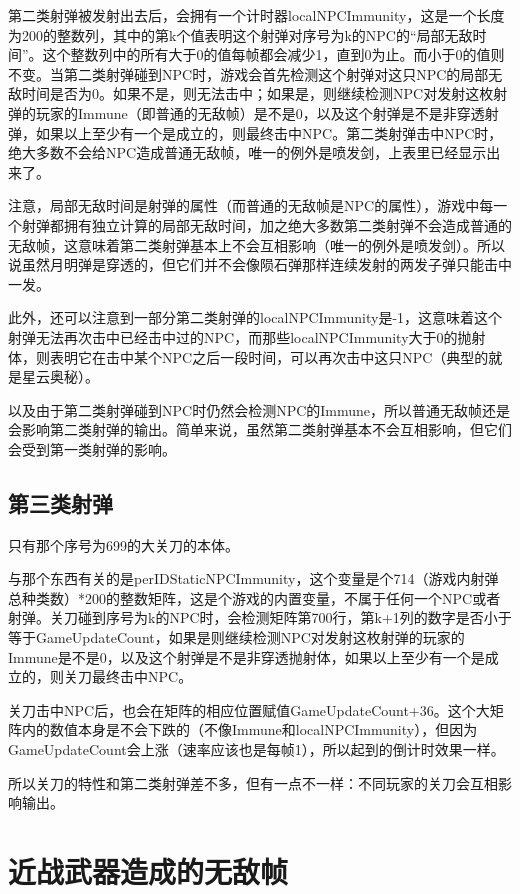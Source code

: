 第二类射弹被发射出去后，会拥有一个计时器localNPCImmunity，这是一个长度为200的整数列，其中的第k个值表明这个射弹对序号为k的NPC的“局部无敌时间”。这个整数列中的所有大于0的值每帧都会减少1，直到0为止。而小于0的值则不变。当第二类射弹碰到NPC时，游戏会首先检测这个射弹对这只NPC的局部无敌时间是否为0。如果不是，则无法击中；如果是，则继续检测NPC对发射这枚射弹的玩家的Immune（即普通的无敌帧）是不是0，以及这个射弹是不是非穿透射弹，如果以上至少有一个是成立的，则最终击中NPC。第二类射弹击中NPC时，绝大多数不会给NPC造成普通无敌帧，唯一的例外是喷发剑，上表里已经显示出来了。

注意，局部无敌时间是射弹的属性（而普通的无敌帧是NPC的属性），游戏中每一个射弹都拥有独立计算的局部无敌时间，加之绝大多数第二类射弹不会造成普通的无敌帧，这意味着第二类射弹基本上不会互相影响（唯一的例外是喷发剑）。所以说虽然月明弹是穿透的，但它们并不会像陨石弹那样连续发射的两发子弹只能击中一发。

此外，还可以注意到一部分第二类射弹的localNPCImmunity是-1，这意味着这个射弹无法再次击中已经击中过的NPC，而那些localNPCImmunity大于0的抛射体，则表明它在击中某个NPC之后一段时间，可以再次击中这只NPC（典型的就是星云奥秘）。

以及由于第二类射弹碰到NPC时仍然会检测NPC的Immune，所以普通无敌帧还是会影响第二类射弹的输出。简单来说，虽然第二类射弹基本不会互相影响，但它们会受到第一类射弹的影响。

\subsection{第三类射弹}

只有那个序号为699的大关刀的本体。

与那个东西有关的是perIDStaticNPCImmunity，这个变量是个714（游戏内射弹总种类数）*200的整数矩阵，这是个游戏的内置变量，不属于任何一个NPC或者射弹。关刀碰到序号为k的NPC时，会检测矩阵第700行，第k+1列的数字是否小于等于GameUpdateCount，如果是则继续检测NPC对发射这枚射弹的玩家的Immune是不是0，以及这个射弹是不是非穿透抛射体，如果以上至少有一个是成立的，则关刀最终击中NPC。

关刀击中NPC后，也会在矩阵的相应位置赋值GameUpdateCount+36。这个大矩阵内的数值本身是不会下跌的（不像Immune和localNPCImmunity），但因为GameUpdateCount会上涨（速率应该也是每帧1），所以起到的倒计时效果一样。

所以关刀的特性和第二类射弹差不多，但有一点不一样：不同玩家的关刀会互相影响输出。

\section{近战武器造成的无敌帧}


